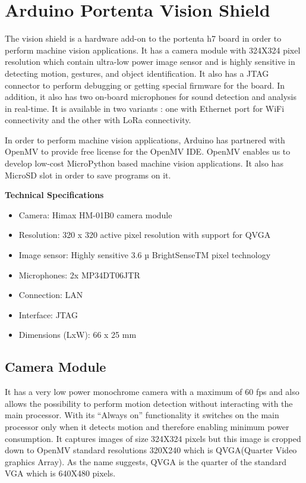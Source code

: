 %
%



\section{Arduino Portenta Vision Shield}


The vision shield is a hardware add-on to the portenta h7 board in order to perform machine vision applications. It has a camera module with 324X324 pixel resolution which contain ultra-low power image sensor and is highly sensitive in detecting motion, gestures, and object identification. It also has a JTAG connector  to perform debugging or getting special firmware for the board.   In addition, it also has  two on-board microphones for sound detection and analysis in real-time. It is available in two variants : one with Ethernet port for WiFi connectivity and the other with LoRa connectivity. 

In order to perform machine vision applications, Arduino has partnered with OpenMV to provide free license for the OpenMV IDE. OpenMV enables us to develop low-cost MicroPython based machine vision applications. It also has MicroSD slot in order to save programs on it.\cite{VisionShield:2021}


\textbf{Technical Specifications}
\begin{itemize}
	\item Camera: Himax HM-01B0 camera module
	\item Resolution: 320 x 320 active pixel resolution with support for QVGA
	\item Image sensor: Highly sensitive 3.6 µ BrightSenseTM pixel technology
	\item Microphones: 2x MP34DT06JTR
	\item Connection: LAN
	\item Interface: JTAG
	\item Dimensions (LxW): 66 x 25 mm 
\end{itemize}
	\subsection{Camera Module} 
	It has a very low power monochrome  camera with a  maximum of 60 fps and also allows the possibility to perform motion detection without interacting with the main processor. With its “Always on” functionality it switches on the main processor only  when it detects motion and therefore enabling minimum power consumption. It captures images of size 324X324 pixels but this image is cropped down to OpenMV standard resolutions 320X240 which is QVGA(Quarter Video graphics Array). As the name suggests, QVGA is the quarter of the standard VGA which is 640X480 pixels.
